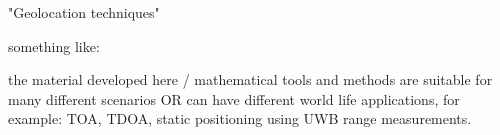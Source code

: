 "Geolocation techniques"

something like:

the material developed here / mathematical tools and methods are suitable for many different scenarios 
OR
can have different world life applications, for example: TOA, TDOA, static positioning using UWB range measurements. 

%
%
%
%
%
